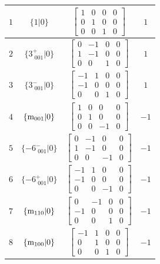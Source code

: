 \documentclass[fleqn,8pt]{jsarticle}
\begin{document}
\begin{longtable}{cccc}
$ 1 $ & $ \{1|0\} $ & $ \begin{bmatrix} 1 & 0 & 0 & 0 \\ 0 & 1 & 0 & 0 \\ 0 & 0 & 1 & 0 \end{bmatrix} $ & $ 1 $ \\ \hline
$ 2 $ & $ \{3^{+}_{\,\,001}|0\} $ & $ \begin{bmatrix} 0 & -1 & 0 & 0 \\ 1 & -1 & 0 & 0 \\ 0 & 0 & 1 & 0 \end{bmatrix} $ & $ 1 $ \\ \hline
$ 3 $ & $ \{3^{-}_{\,\,001}|0\} $ & $ \begin{bmatrix} -1 & 1 & 0 & 0 \\ -1 & 0 & 0 & 0 \\ 0 & 0 & 1 & 0 \end{bmatrix} $ & $ 1 $ \\ \hline
$ 4 $ & $ \{{\rm m}_{001}|0\} $ & $ \begin{bmatrix} 1 & 0 & 0 & 0 \\ 0 & 1 & 0 & 0 \\ 0 & 0 & -1 & 0 \end{bmatrix} $ & $ -1 $ \\ \hline
$ 5 $ & $ \{-6^{-}_{\,\,001}|0\} $ & $ \begin{bmatrix} 0 & -1 & 0 & 0 \\ 1 & -1 & 0 & 0 \\ 0 & 0 & -1 & 0 \end{bmatrix} $ & $ -1 $ \\ \hline
$ 6 $ & $ \{-6^{+}_{\,\,001}|0\} $ & $ \begin{bmatrix} -1 & 1 & 0 & 0 \\ -1 & 0 & 0 & 0 \\ 0 & 0 & -1 & 0 \end{bmatrix} $ & $ -1 $ \\ \hline
$ 7 $ & $ \{{\rm m}_{110}|0\} $ & $ \begin{bmatrix} 0 & -1 & 0 & 0 \\ -1 & 0 & 0 & 0 \\ 0 & 0 & 1 & 0 \end{bmatrix} $ & $ -1 $ \\ \hline
$ 8 $ & $ \{{\rm m}_{100}|0\} $ & $ \begin{bmatrix} -1 & 1 & 0 & 0 \\ 0 & 1 & 0 & 0 \\ 0 & 0 & 1 & 0 \end{bmatrix} $ & $ -1 $ \\ \hline

\end{longtable}
\end{document}
